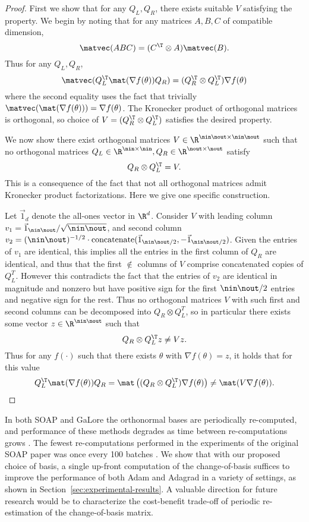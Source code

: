     \begin{proof}
        First we show that for any $Q_L, Q_R$, there exists suitable $V$ satisfying the property. We begin by noting that for any matrices $A, B, C$ of compatible dimension,
        \[
            \matvec(ABC) = (C^{\T} \otimes A) \matvec(B).
        \]
        Thus for any $Q_L, Q_R$,
        \[
            \matvec(Q_L^{\T} \mat(\nabla f(\theta)) Q_R) = (Q_R^\T \otimes Q_L^\T)\nabla f(\theta)
        \]
        where the second equality uses the fact that trivially $\matvec(\mat(\nabla f(\theta))) = \nabla f(\theta)$. The Kronecker product of orthogonal matrices is orthogonal, so choice of $V = (Q_R^\T \otimes Q_L^\T)$ satisfies the desired property.

        We now show there exist orthogonal matrices $V\in \R^{\nin\nout\times \nin\nout}$ such that no orthogonal matrices $Q_L\in\R^{\nin\times \nin},Q_R\in\R^{\nout\times\nout}$ satisfy
        \[
           Q_R \otimes Q_L^{\T} = V.
        \]
        This is a consequence of the fact that not all orthogonal matrices admit Kronecker product factorizations. Here we give one specific construction.
        
        Let $\vec{1}_d$ denote the all-ones vector in $\R^d$. Consider $V$ with leading column $v_1 = \vec{1}_{\nin\nout}/\sqrt{\nin \nout}$, and second column $v_2 = (\nin\nout)^{-1/2}\cdot\operatorname{concatenate}(\vec{1}_{\nin\nout/2}, -\vec{1}_{\nin\nout/2})$. Given the entries of $v_1$ are identical, this implies all the entries in the first column of $Q_R$ are identical, and thus that the first $\nin$ columns of $V$ comprise concatenated copies of $Q_L^T$. However this contradicts the fact that the entries of $v_2$ are identical in magnitude and nonzero but have positive sign for the first $\nin\nout/2$ entries and negative sign for the rest. Thus no orthogonal matrices $V$ with such first and second columns can be decomposed into $Q_R \otimes Q_L^T$, so in particular there exists some vector $z\in \R^{\nin\nout}$ such that
        \[
            Q_R \otimes Q_L^{\T} z \neq V z.
        \]
        Thus for any $f(\cdot)$ such that there exists $\theta$ with $\nabla f(\theta)=z$, it holds that for this value
        \[
            Q_L^{\T} \mat(\nabla f(\theta)) Q_R = \mat\left((Q_R \otimes Q_L^{\T})\nabla f(\theta)\right)\neq  \mat(V\nabla f(\theta)).
        \]
    \end{proof}

    In both SOAP and GaLore the orthonormal bases are periodically re-computed, and performance of these methods degrades as time between re-computations grows \cite{vyas2024soap, zhao2024galore}. The fewest re-computations performed in the experiments of the original SOAP paper was once every 100 batches \cite{vyas2024soap}. We show that with our proposed choice of basis, a single up-front computation of the change-of-basis suffices to improve the performance of both Adam and Adagrad in a variety of settings, as shown in Section~\ref{sec:experimental-results}. A valuable direction for future research would be to characterize the cost-benefit trade-off of periodic re-estimation of the change-of-basis matrix.